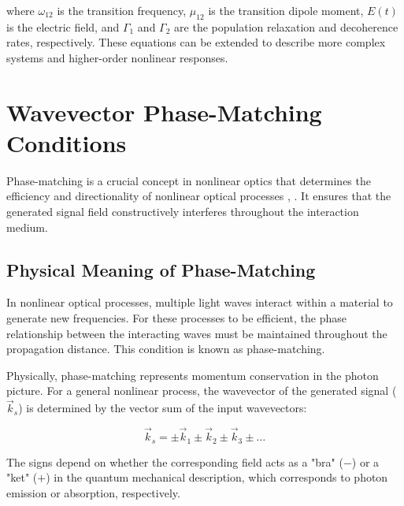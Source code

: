 \noindent where $\omega_{12}$ is the transition frequency, $\mu_{12}$ is the transition dipole moment, $E(t)$ is the electric field, and $\Gamma_1$ and $\Gamma_2$ are the population relaxation and decoherence rates, respectively. These equations can be extended to describe more complex systems and higher-order nonlinear responses.


\section{Wavevector Phase-Matching Conditions}
\label{sec:phase_matching}

\noindent Phase-matching is a crucial concept in nonlinear optics that determines the efficiency and directionality of nonlinear optical processes \cite{Boyd2008Contents},  . It ensures that the generated signal field constructively interferes throughout the interaction medium.

\subsection{Physical Meaning of Phase-Matching}
\label{subsec:phase_matching_meaning}

\noindent In nonlinear optical processes, multiple light waves interact within a material to generate new frequencies. For these processes to be efficient, the phase relationship between the interacting waves must be maintained throughout the propagation distance. This condition is known as phase-matching.

\noindent Physically, phase-matching represents momentum conservation in the photon picture. For a general nonlinear process, the wavevector of the generated signal ($\vec{k}_s$) is determined by the vector sum of the input wavevectors:

\begin{equation}
    \vec{k}_s = \pm\vec{k}_1 \pm\vec{k}_2 \pm\vec{k}_3 \pm \ldots
    \label{eq:phase_matching}
\end{equation}

\noindent The signs depend on whether the corresponding field acts as a "bra" ($-$) or a "ket" ($+$) in the quantum mechanical description, which corresponds to photon emission or absorption, respectively.

